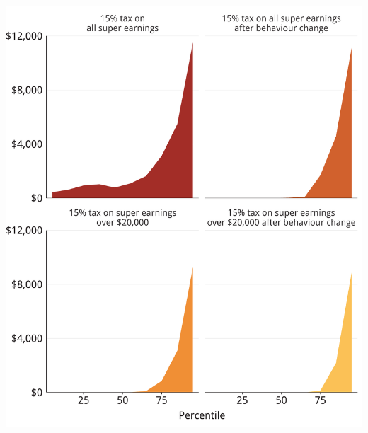 \documentclass[tikz]{standalone}\usepackage[]{graphicx}\usepackage[]{color}
\newenvironment{knitrout}{}{} %
\begin{document}
\begin{knitrout}
\color{fgcolor}
\includegraphics[width=11.000in,height=13in]{./Super-tax-targeting/b5-super-atlas/Figure6-2-1} 

\end{knitrout}
\end{document}
